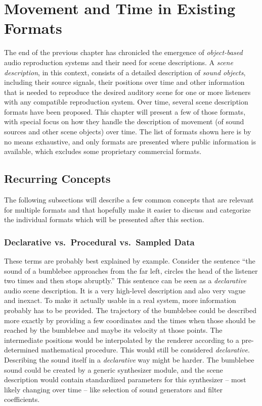 \chapter{Movement and Time in Existing Formats}
\label{sec:existing-formats}

The end of the previous chapter has chronicled the emergence of
\emph{object-based} audio reproduction systems
and their need for scene descriptions.
A \emph{scene description}, in this context,
consists of a detailed description of \emph{sound objects},
including their source signals, their positions over time
and other information that is needed
to reproduce the desired auditory scene for one or more listeners
with any compatible reproduction system.
Over time, several scene description formats
have been proposed.
This chapter will present a few of those formats,
with special focus on how they handle the description of movement
(of sound sources and other scene objects) over time.
The list of formats shown here is by no means exhaustive,
and only formats are presented where public information is available,
which excludes some proprietary commercial formats.


\section{Recurring Concepts}

The following subsections will describe a few common concepts
that are relevant for multiple formats
and that hopefully make it easier
to discuss and categorize the individual formats
which will be presented after this section.

\subsection{Declarative vs.\ Procedural vs.\ Sampled Data}
\label{sec:declarative-procedural-sampled}

These terms are probably best explained by example.
Consider the sentence ``the sound of a bumblebee approaches from the far left,
circles the head of the listener two times and then stops abruptly.''
This sentence can be seen as a \emph{declarative} audio scene description.
It is a very high-level description and also very vague and inexact.
To make it actually usable in a real system,
more information probably has to be provided.
The trajectory of the bumblebee could be described more exactly by
providing a few coordinates and the times when those should be reached by the
bumblebee and maybe its velocity at those points.
The intermediate positions would be interpolated by the renderer
according to a pre-determined mathematical procedure.
This would still be considered \emph{declarative}.
Describing the sound itself in a \emph{declarative} way might be harder.
The bumblebee sound could be created by a generic synthesizer module,
and the scene description would contain
standardized parameters for this synthesizer
-- most likely changing over time --
like selection of sound generators and filter coefficients.

